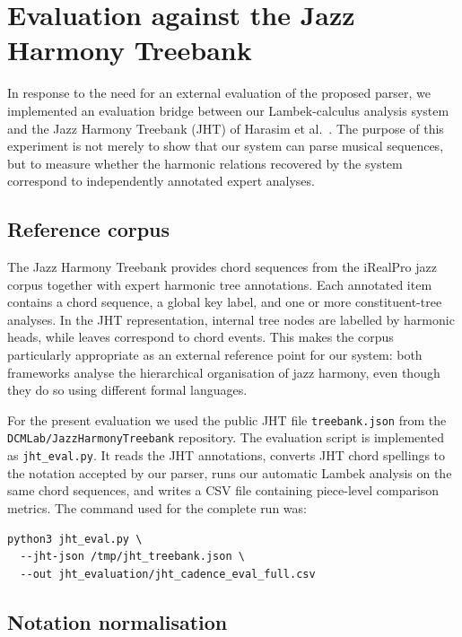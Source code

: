 \section{Evaluation against the Jazz Harmony Treebank}
\label{sec:jht-evaluation}

In response to the need for an external evaluation of the proposed parser, we
implemented an evaluation bridge between our Lambek-calculus analysis system
and the Jazz Harmony Treebank (JHT) of Harasim et al.~\cite{harasim2020jazz}.
The purpose of this experiment is not merely to show that our system can parse
musical sequences, but to measure whether the harmonic relations recovered by
the system correspond to independently annotated expert analyses.

\subsection{Reference corpus}

The Jazz Harmony Treebank provides chord sequences from the iRealPro jazz
corpus together with expert harmonic tree annotations. Each annotated item
contains a chord sequence, a global key label, and one or more constituent-tree
analyses. In the JHT representation, internal tree nodes are labelled by
harmonic heads, while leaves correspond to chord events. This makes the corpus
particularly appropriate as an external reference point for our system: both
frameworks analyse the hierarchical organisation of jazz harmony, even though
they do so using different formal languages.

For the present evaluation we used the public JHT file \texttt{treebank.json}
from the \texttt{DCMLab/JazzHarmonyTreebank} repository. The evaluation script
is implemented as \texttt{jht\_eval.py}. It reads the JHT annotations, converts
JHT chord spellings to the notation accepted by our parser, runs our automatic
Lambek analysis on the same chord sequences, and writes a CSV file containing
piece-level comparison metrics. The command used for the complete run was:

\begin{verbatim}
python3 jht_eval.py \
  --jht-json /tmp/jht_treebank.json \
  --out jht_evaluation/jht_cadence_eval_full.csv
\end{verbatim}

\subsection{Notation normalisation}


